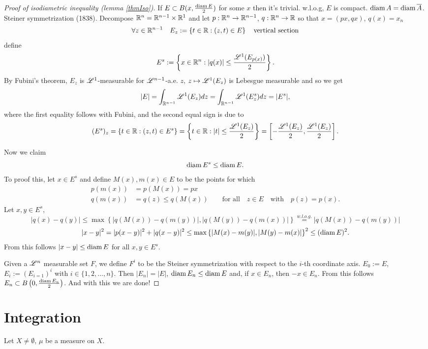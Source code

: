 \begin{proof}[Proof of isodiametric inequality (lemma \ref{thmIso})]
If $E \subset B(x, \frac{\operatorname{diam} E}{2})$ for some $x$ then it's trivial.
w.l.o.g, $E$ is compact. $\operatorname{diam} A = \operatorname{diam} \overline{A}$.
Steiner symmetrization (1838). Decompose $\mathbb{R}^n = \mathbb{R}^{n-1}\times \mathbb{R}^1$ and let $p
: \mathbb{R}^n \to \mathbb{R}^{n-1}$, $q: \mathbb{R}^n \to \mathbb{R}$ so that $x = (px, qx)$, $q(x) = x_n$
\[
\forall z \in \mathbb{R}^{n-1} \quad E_z := \left\{t\in\mathbb{R} : (z,t) \in E\right\}
\quad \textnormal{vertical section}
\]
define
\[
E^s := \left\{ x \in \mathbb{R}^n: |q(x)| \leq \frac{\mathscr{L}^{1}(E_{p(x)})}{2}\right\}.
\]
By Fubini's theorem, $E_z$ is $\mathscr{L}^{1}$-measurable for
$\mathscr{L}^{n-1}$-a.e. $z$, $z \mapsto \mathscr{L}^{1}(E_z)$ is Lebesgue
measurable and so we get
\[
|E| = \int_{\mathbb{R}^{n-1}} \mathscr{L}^{1}(E_z) dz = \int_{\mathbb{R}^{n-1}}
\mathscr{L}^{1}(E_z^s) dz = |E^s|,
\]
where the first equality follows with Fubini,
and the second equal sign is due to 
\[
(E^s)_z = \{ t\in\mathbb{R} : (z,t) \in E^s \}
= \left\{ t\in \mathbb{R} : |t| \leq \frac{\mathscr{L}^{1}(E_z)}{2} \right\}
= \left[ - \frac{\mathscr{L}^{1}(E_z)}{2}, \frac{\mathscr{L}^{1}(E_z)}{2} \right].
\]

Now we claim 
$$\operatorname{diam} E^s \leq \operatorname{diam} E.$$ 
To proof this, let $x \in E^s$ and define $M(x), m(x)
\in E$ to be the points for which 
\[
\begin{aligned}
p(m(x)) &= p(M (x)) = px
\\
q(m(x)) &= q(z) \leq q(M(x))
\qquad \text{for all} \quad z \in E \quad \text{with} \quad p(z) = p(x).
\end{aligned}
\]
Let $x,y \in E^s$, 
\[
|q(x) - q(y)| \leq \max \left\{|q(M(x)) - q(m(y))|, |q(M(y)) - q(m(x))|\right\}
\overset{w.l.o.g.}{=} |q(M(x)) - q(m(y))|
\]
\[
|x-y|^2 = |p(x-y)|^2 + |q(x-y)|^2 \leq \max \left\{|M(x) - m(y)|, |M(y) -
m(x)|\right\}^2
\leq (\operatorname{diam} E)^2 .
\]
From this follows $|x - y| \leq \operatorname{diam} E$ for all $x,y \in E^s$.

Given a $\mathscr{L}^{n}$ measurable set $F$, we define $F^i$ to be the Steiner
symmetrization with respect to the $i$-th coordinate axis.
$E_0 := E$, $E_i := (E_{i=1})^i$ with $i \in \{1,2,\dots,n\}$. Then $|E_n| = |E|$,
$\operatorname{diam} E_n \leq \operatorname{diam} E$ and, if $x\in E_n$, then $-x \in E_n$. From this
follows $E_n \subset B\left(0,\frac{\operatorname{diam} E_n}{2}\right)$.
And with this we are done!
\end{proof}

\section{Integration}

Let $X \neq \emptyset$, $\mu$ be a measure on $X$.

